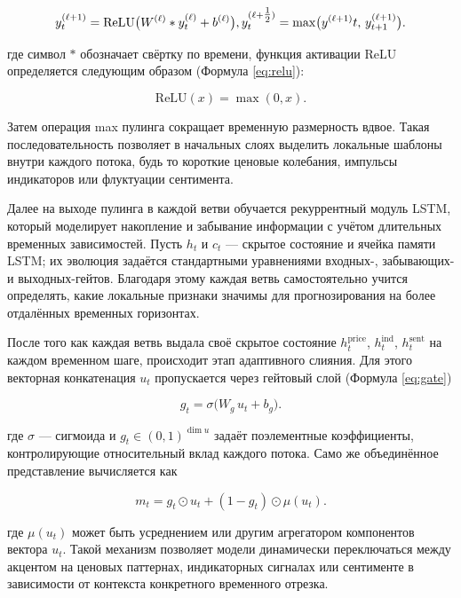 \begin{equation}\label{eq:relu_pooling}
    y^{(\ell+1)}_{t} = \mathrm{ReLU}\bigl(W^{(\ell)} * y^{(\ell)}_{t} + b^{(\ell)}\bigr), \\
    y^{(\ell+\tfrac12)}_{t} = \max\bigl(y^{(\ell+1)}{t},\,y^{(\ell+1)}_{t+1}\bigr).
\end{equation}

где символ $*$ обозначает свёртку по времени, функция активации $\mathrm{ReLU}$ определяется следующим образом (Формула \ref{eq:relu}):

\begin{equation}\label{eq:relu}
    \mathrm{ReLU}(x)=\max(0, x).
\end{equation}

Затем операция max пулинга сокращает временную размерность вдвое. Такая последовательность позволяет
в начальных слоях выделить локальные шаблоны внутри каждого потока, будь то короткие ценовые колебания,
импульсы индикаторов или флуктуации сентимента.

Далее на выходе пулинга в каждой ветви обучается рекуррентный модуль LSTM, который моделирует накопление
и забывание информации с учётом длительных временных зависимостей. Пусть $h_t$ и $c_t$ — скрытое состояние
и ячейка памяти LSTM; их эволюция задаётся стандартными уравнениями входных-, забывающих- и выходных-гейтов. Благодаря
этому каждая ветвь самостоятельно учится определять, какие локальные признаки значимы для прогнозирования
на более отдалённых временных горизонтах.

После того как каждая ветвь выдала своё скрытое состояние $h_t^{\mathrm{price}}$, $h_t^{\mathrm{ind}}$, $h_t^{\mathrm{sent}}$
на каждом временном шаге, происходит этап адаптивного слияния. Для этого векторная конкатенация $u_t$ пропускается через
гейтовый слой (Формула \ref{eq:gate})

\begin{equation}\label{eq:gate}
    g_t = \sigma\bigl(W_g\,u_t + b_g\bigr).
\end{equation}

где $\sigma$ --- сигмоида и $g_t\in(0,1)^{\dim u}$ задаёт поэлементные коэффициенты,
контролирующие относительный вклад каждого потока. Само же объединённое представление вычисляется как

\begin{equation}
    m_t = g_t\odot u_t + (1-g_t)\odot\mu(u_t).
\end{equation}

где $\mu(u_t)$ может быть усреднением или другим агрегатором компонентов вектора $u_t$.
Такой механизм позволяет модели динамически переключаться между акцентом на ценовых паттернах,
индикаторных сигналах или сентименте в зависимости от контекста конкретного временного отрезка.

